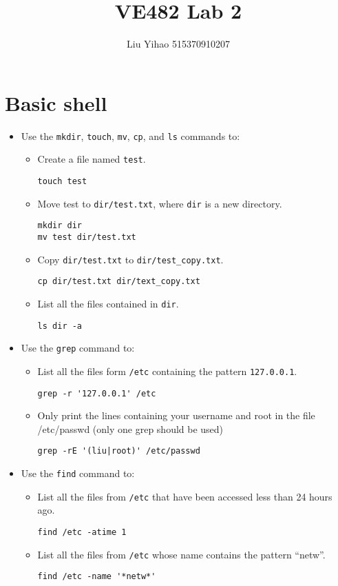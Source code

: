 \documentclass{article}
\title{VE482 Lab 2}
\author{Liu Yihao 515370910207}
\date{}
\begin{document}
\maketitle

\section{Basic shell}
\begin{itemize}
\item Use the \texttt{mkdir}, \texttt{touch}, \texttt{mv}, \texttt{cp}, and \texttt{ls} commands to:
\begin{itemize}
\item Create a file named \texttt{test}.
\begin{verbatim}
touch test
\end{verbatim}
\item Move test to \texttt{dir/test.txt}, where \texttt{dir} is a new directory.
\begin{verbatim}
mkdir dir
mv test dir/test.txt
\end{verbatim}
\item Copy \texttt{dir/test.txt} to \texttt{dir/test_copy.txt}.
\begin{verbatim}
cp dir/test.txt dir/text_copy.txt
\end{verbatim}
\item List all the files contained in \texttt{dir}.
\begin{verbatim}
ls dir -a
\end{verbatim}
\end{itemize}

\item Use the \texttt{grep} command to:
\begin{itemize}
\item List all the files form \texttt{/etc} containing the pattern \texttt{127.0.0.1}.
\begin{verbatim}
grep -r '127.0.0.1' /etc
\end{verbatim}
\item Only print the lines containing your username and root in the file /etc/passwd (only one grep should be used)
\begin{verbatim}
grep -rE '(liu|root)' /etc/passwd
\end{verbatim}
\end{itemize}

\item Use the \texttt{find} command to:
\begin{itemize}
\item List all the files from \texttt{/etc} that have been accessed less than 24 hours ago.
\begin{verbatim}
find /etc -atime 1
\end{verbatim}
\item List all the files from \texttt{/etc} whose name contains the pattern ``netw''.
\begin{verbatim}
find /etc -name '*netw*'
\end{verbatim}
\end{itemize}


\end{itemize}
\end{document}
